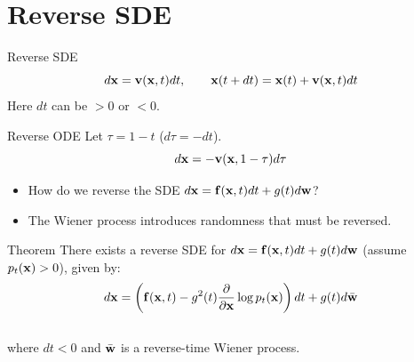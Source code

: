 \documentclass{beamer}
\begin{document}
\section{Reverse SDE}
\begin{frame}{Reverse SDE}
	\vspace{-0.3cm}
	\[
		d\mathbf{x} = \mathbf{v}(\mathbf{x}, t) dt,\qquad \mathbf{x}(t + dt) = \mathbf{x}(t) + \mathbf{v}(\mathbf{x}, t) dt
	\]
	Here $dt$ can be $>0$ or $<0$.
	\eqpause
	\begin{block}{Reverse ODE}
		Let $\tau = 1 - t$ ($d\tau = -dt$).
		\vspace{-0.3cm}
		\[
			d\mathbf{x} = - \mathbf{v}(\mathbf{x}, 1 - \tau) d\tau
		\]
	\end{block}
	\eqpause
	\vspace{-0.5cm}
	\begin{itemize}
		\item How do we reverse the SDE $d\mathbf{x} = \mathbf{f}(\mathbf{x}, t) dt + g(t) d \mathbf{w}$? 
		\item The Wiener process introduces randomness that must be reversed.
	\end{itemize}
	\eqpause
	\vspace{-0.3cm}
	\begin{block}{Theorem}
		There exists a reverse SDE for $d\mathbf{x} = \mathbf{f}(\mathbf{x}, t) dt + g(t) d \mathbf{w}$ (assume $p_t(\mathbf{x}) > 0$), given by:
		\vspace{-0.3cm}
		\[
			d\mathbf{x} = \left(\mathbf{f}(\mathbf{x}, t) - g^2(t) \frac{\partial}{\partial \mathbf{x}}\log p_t(\mathbf{x})\right) dt + g(t) d \bar{\mathbf{w}}
		\]
		\vspace{-0.5cm}\\
		where $dt<0$ and $\bar{\mathbf{w}}$ is a reverse-time Wiener process.
	\end{block}
\end{frame}
\end{document}
